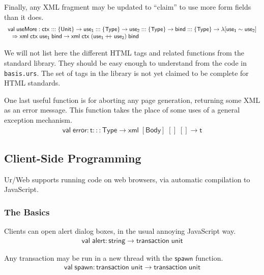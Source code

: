 \documentclass{article}
\newcommand{\mt}[1]{\mathsf{#1}}
\newcommand{\rc}{+ \hspace{-.075in} + \;}
\begin{document}
Finally, any XML fragment may be updated to ``claim'' to use more form fields than it does.
$$\begin{array}{l}
  \mt{val} \; \mt{useMore} : \mt{ctx} ::: \{\mt{Unit}\} \to \mt{use_1} ::: \{\mt{Type}\} \to \mt{use_2} ::: \{\mt{Type}\} \to \mt{bind} ::: \{\mt{Type}\} \to \lambda [\mt{use_1} \sim \mt{use_2}] \\
  \hspace{.1in} \Rightarrow \mt{xml} \; \mt{ctx} \; \mt{use_1} \; \mt{bind} \to \mt{xml} \; \mt{ctx} \; (\mt{use_1} \rc \mt{use_2}) \; \mt{bind}
\end{array}$$

We will not list here the different HTML tags and related functions from the standard library.  They should be easy enough to understand from the code in \texttt{basis.urs}.  The set of tags in the library is not yet claimed to be complete for HTML standards.

One last useful function is for aborting any page generation, returning some XML as an error message.  This function takes the place of some uses of a general exception mechanism.
$$\begin{array}{l}
  \mt{val} \; \mt{error} : \mt{t} ::: \mt{Type} \to \mt{xml} \; [\mt{Body}] \; [] \; [] \to \mt{t}
\end{array}$$


\subsection{Client-Side Programming}

Ur/Web supports running code on web browsers, via automatic compilation to JavaScript.

\subsubsection{The Basics}

Clients can open alert dialog boxes, in the usual annoying JavaScript way.
$$\begin{array}{l}
  \mt{val} \; \mt{alert} : \mt{string} \to \mt{transaction} \; \mt{unit}
\end{array}$$

Any transaction may be run in a new thread with the $\mt{spawn}$ function.
$$\begin{array}{l}
  \mt{val} \; \mt{spawn} : \mt{transaction} \; \mt{unit} \to \mt{transaction} \; \mt{unit}
\end{array}$$
\end{document}
